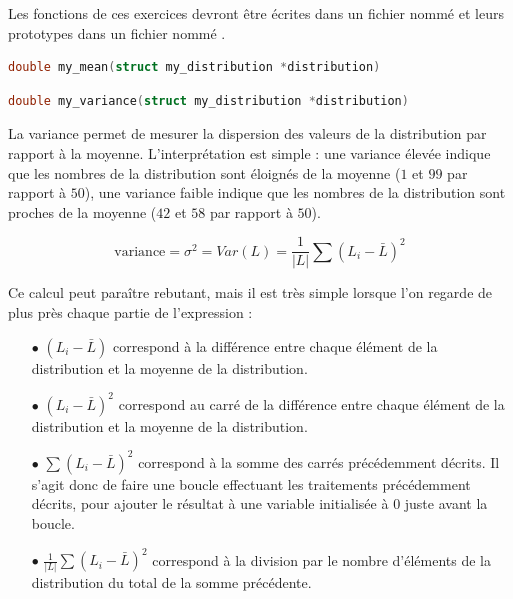 \documentclass[11pt,a4paper]{article}
\begin{document}
Les fonctions de ces exercices devront être écrites dans un fichier nommé  et leurs prototypes dans un fichier nommé  .

\medskip


\begin{lstlisting}[language=C,morekeywords={floor,ceil}]
double my_mean(struct my_distribution *distribution) \end{lstlisting}



\begin{lstlisting}[language=C,morekeywords={floor,ceil}]
double my_variance(struct my_distribution *distribution) \end{lstlisting}

La variance permet de mesurer la dispersion des valeurs de la distribution par rapport à la moyenne.
L'interprétation est simple : une variance élevée indique que les nombres de la distribution sont éloignés de la moyenne ($ 1 $ et $ 99 $ par rapport à $ 50 $), une variance faible indique que les nombres de la distribution sont proches de la moyenne ($ 42 $ et $ 58 $ par rapport à $ 50 $).

\begin{center}
\begin{equation*}
\text{variance} = \sigma^{2} = Var(L) = \frac{1}{|L|} \sum (L_{i} - \bar{L})^{2}
\end{equation*}
\end{center}

\bigskip

Ce calcul peut paraître rebutant, mais il est très simple lorsque l'on regarde de plus près chaque partie de l'expression :

\medskip

\begin{itemize}
\item[$\bullet$] $ (L_{i} - \bar{L}) $ correspond à la différence entre chaque élément de la distribution et la moyenne de la distribution.

\item[$\bullet$] $ (L_{i} - \bar{L})^{2} $ correspond au carré de la différence entre chaque élément de la distribution et la moyenne de la distribution.

\item[$\bullet$] $ \sum (L_{i} - \bar{L})^{2} $ correspond à la somme des carrés précédemment décrits. Il s'agit donc de faire une boucle effectuant les traitements précédemment décrits, pour ajouter le résultat à une variable initialisée à $ 0 $ juste avant la boucle.

\item[$\bullet$] $ \frac{1}{|L|} \sum (L_{i} - \bar{L})^{2} $ correspond à la division par le nombre d'éléments de la distribution du total de la somme précédente.
\end{itemize}
\end{document}
